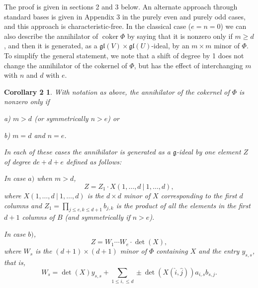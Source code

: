 \documentclass{tran-l}
\theoremstyle{plain}
\newtheorem*{theorem2}{Corollary 2}
\theoremstyle{remark}
\theoremstyle{definition}
\newcommand{\g}{{\mathfrak g}}
\newcommand{\gl}{{\mathfrak {gl}}}
\newcommand{\coker}{\operatorname{coker}}
\begin{document}
The proof is given in sections 2 and 3 below.
An alternate approach through standard bases
is given in Appendix 3 in the purely even and purely
odd cases, and this approach is characteristic-free. 
In the classical case ($e=n=0$) we can also describe the
annihilator of $\coker \Phi $ by saying that it is nonzero only if
$m\geq d$, and then it is generated, as a
${\gl }(V)\times {\gl }(U)$-ideal, by an
$m\times m$ minor of $\Phi $. To simplify the general statement,
we note that a shift of degree
by 1 does not change the annihilator of the cokernel of $\Phi $,
but has the effect of interchanging $m$ with $n$ and $d$ with $e$.
\begin{theorem2} With notation as above, 
the annihilator of the cokernel of $\Phi $ is
nonzero only if

{a)} $m> d$ (or symmetrically $n> e$) or

{b)} $m=d$ and $n=e$.


\noindent In each of these cases the annihilator is generated as
a $\g $-ideal by one element $Z$ of degree $de+d+e$ defined as follows:


In case $a)$ when $m>d$,
\begin{equation*}Z=Z_{1} \cdot X(1,\ldots ,d\ |\ 1,\ldots ,d ),\end{equation*}
where $X(1,\ldots ,d\ |\ 1,\ldots ,d)$ is the
$d\times d$ minor of $X$
corresponding to the first $d$ columns and
$Z_{1} =\prod _{j\leq e,k\leq d+1}b_{j,k}$ is the product
of all the elements in the first $d+1$ columns of $B$
(and symmetrically if $n>e$).

In case $b)$,
\begin{equation*}Z= W_{1}\cdots W_{e}\cdot \det(X), \end{equation*}
where $W_{s}$ is the $(d+1)\times (d+1)$ minor of
$\Phi $ containing $X$ and the entry $y_{s,s}$, that is,
\begin{equation*}W_{s} = \det(X)y_{s,s}+\sum _{1\le i,\le d}\pm 
\det(X({\hat i},{\hat j}))a_{i,s}b_{s,j}.\end{equation*}
\end{theorem2}
\end{document}
